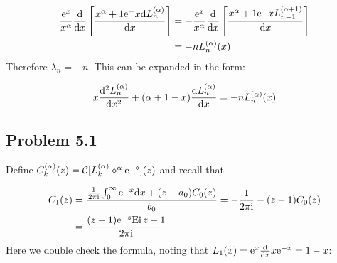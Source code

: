 \documentclass[12pt,a4paper]{article}
\def\D{ {\rm d} }
\def\I{ {\rm i} }
\def\E{ {\rm e} }
\def\CC{ {\cal C} }
\def\Ei{ {\rm Ei}\, }
\def\dx{\D x}
\def\br[#1]{\left[{#1}\right]}
\begin{document}
\begin{align*}
{\E^x \over x^\alpha} {\D \over \dx} \br[x^{\alpha+1} \E^{-x} {\D L_n^{(\alpha)} \over \dx}] &= -{\E^x \over x^\alpha} {\D \over \dx} \br[x^{\alpha+1} \E^{-x} { L_{n-1}^{(\alpha+1)} \over \dx}] \\
&= -n L_{n}^{(\alpha)}(x) 
\end{align*}
Therefore $\lambda_n = -n$. This can be expanded in the form:

\[
x {\D^2 L_n^{(\alpha)} \over \dx^2} + (\alpha+1 - x) {\D L_n^{(\alpha)} \over \dx} = -n L_n^{(\alpha)}(x)
\]
\subsection{Problem 5.1}
Define $C_k^{(\alpha)}(z) = \CC[L_k^{(\alpha)} \diamond^\alpha \E^{-\diamond}](z)$ and recall that 


\begin{align*}
C_1(z)  &= {{1 \over 2 \pi \I} \int_0^\infty \E^{-x} \dx + (z-a_0) C_0(z) \over b_0} = -{1 \over 2 \pi \I}  - (z-1) C_0(z)    \\
&= {(z-1) \E^{-z} \Ei z -1 \over 2 \pi \I} 
\end{align*}
Here we double check the formula, noting that $L_1(x) = \E^x {\D \over \dx} x \E^{-x} = 1 - x$:
\end{document}
